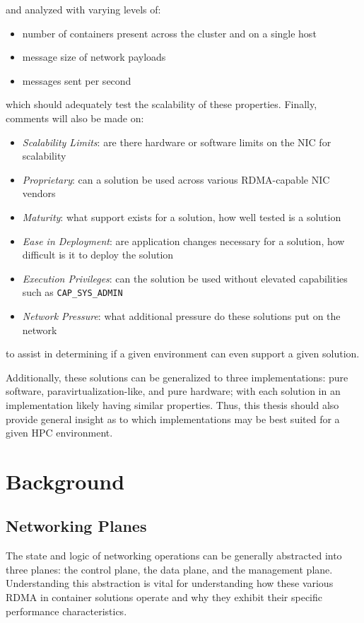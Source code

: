 \documentclass[12pt,titlepage]{article}
\begin{document}
\noindent
and analyzed with varying levels of:
\begin{itemize}[nolistsep]
   \item number of containers present across the cluster and on a single host
   \item message size of network payloads
   \item messages sent per second
\end{itemize}
which should adequately test the scalability of these properties.
Finally, comments will also be made on:
\begin{itemize}[nolistsep]
   \item \textit{Scalability Limits}: are there hardware or software limits on the NIC for scalability
   \item \textit{Proprietary}: can a solution be used across various RDMA-capable NIC vendors
   \item \textit{Maturity}: what support exists for a solution, how well tested is a solution
   \item \textit{Ease in Deployment}: are application changes necessary for a solution, how difficult is it to deploy the solution
   \item \textit{Execution Privileges}: can the solution be used without elevated capabilities such as \texttt{CAP\_SYS\_ADMIN}
   \item \textit{Network Pressure}: what additional pressure do these solutions put on the network
\end{itemize}
to assist in determining if a given environment can even support a given solution.

Additionally, these solutions can be generalized to three implementations: pure software, paravirtualization-like, and pure hardware;
with each solution in an implementation likely having similar properties.
Thus, this thesis should also provide general insight as to which implementations may be best suited for a given HPC environment.


\section{Background}
\subsection{Networking Planes}\label{subsec:Networking Planes}
The state and logic of networking operations can be generally abstracted into three planes: the control plane, the data plane, and the management plane.
Understanding this abstraction is vital for understanding how these various RDMA in container solutions operate and why they exhibit their specific performance characteristics.
\end{document}

